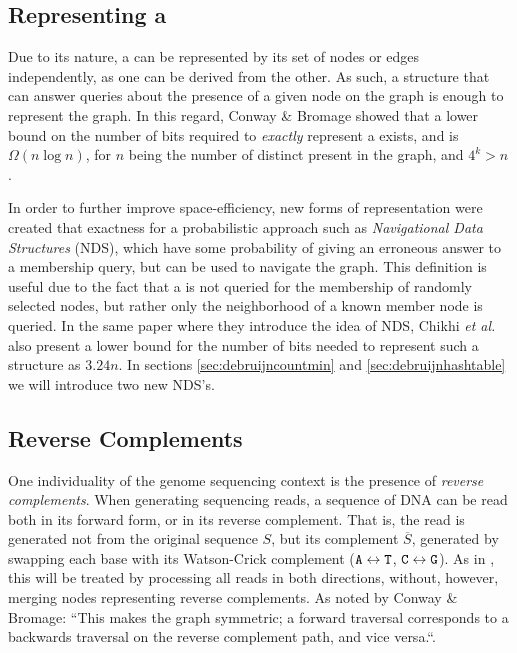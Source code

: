 \subsection{Representing a \dBG}

Due to its nature, a \dBG can be represented by its set of nodes or edges independently, as one can be derived from the other.
 As such, a structure that can answer queries about the presence of a given node on the graph is enough to
represent the graph. In this regard, Conway \& Bromage showed that a lower bound on the number of bits required to \emph{exactly}
represent a \dBG exists, and is $\Omega(n \log n)$, for $n$ being the number of distinct \kmers present in the graph, and $4^k > n$
\cite{Conway2011}.

In order to further improve space-efficiency, new forms of representation were created that  exactness for a probabilistic approach
such as \emph{Navigational Data Structures} (NDS), which have some probability of giving an erroneous answer to a membership query, 
but can be used to navigate the graph. This definition is useful due to the fact that a \dBG is not queried for the membership of randomly
selected nodes, but rather only the neighborhood of a known member node is queried\cite{Chikhi2014}. In the same paper where they introduce
the idea of NDS, Chikhi \emph{et al.} also present a lower bound for the number of bits needed to represent such a structure as $3.24n$.
In sections \ref{sec:debruijncountmin} and \ref{sec:debruijnhashtable} we will introduce two new NDS's.

\subsection{Reverse Complements}

One individuality of the genome sequencing context is the presence of \emph{reverse complements}. When generating sequencing reads,
a sequence of DNA can be read both in its forward form, or in its reverse complement. That is, the read is generated not from the
original sequence $S$, but its complement $\overline{S}$, generated by swapping each base with its Watson-Crick complement
($\mathtt{A} \leftrightarrow \mathtt{T}$, $\mathtt{C} \leftrightarrow \mathtt{G}$). As in \cite{Conway2011}, this will be treated by processing all reads in both
directions, without, however, merging nodes representing reverse complements. As noted by Conway \& Bromage: ``This makes the graph
symmetric; a forward traversal corresponds to a backwards traversal on the reverse complement path, and vice versa.``\cite{Conway2011}.


